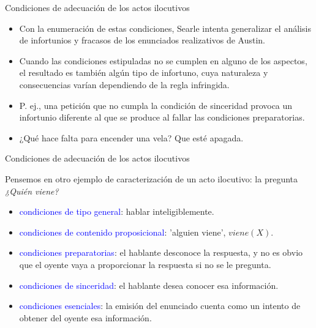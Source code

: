 \documentclass{beamer}
\begin{document}
\begin{frame}{Condiciones de adecuación de los actos ilocutivos}

	\begin{itemize}
		\item Con la enumeración de estas condiciones, Searle intenta generalizar el análisis de infortunios y fracasos de los enunciados realizativos de Austin. 
		\item Cuando las condiciones estipuladas no se cumplen en alguno de los aspectos, el resultado es también algún tipo de infortuno, cuya naturaleza y consecuencias varían dependiendo de la regla infringida.
		\item P. ej., una petición que no cumpla la condición de sinceridad provoca un infortunio diferente al que se produce al fallar las condiciones preparatorias.
		\item ¿Qué hace falta para encender una vela? \pause Que esté apagada.
	\end{itemize}

\end{frame}

\begin{frame}{Condiciones de adecuación de los actos ilocutivos}

	Pensemos en otro ejemplo de caracterización de un acto ilocutivo: la pregunta \it{¿Quién viene?}

	\begin{itemize}
		\item \textcolor{blue}{condiciones de tipo general}: hablar inteligiblemente.
		\item \textcolor{blue}{condiciones de contenido proposicional}: 'alguien viene', $viene(X)$.
		\item \textcolor{blue}{condiciones preparatorias}: el hablante desconoce la respuesta, y no es obvio que el oyente vaya a proporcionar la respuesta si no se le pregunta. 
		\item \textcolor{blue}{condiciones de sinceridad}: el hablante desea conocer esa información.
		\item \textcolor{blue}{condiciones esenciales}: la emisión del enunciado cuenta como un intento de obtener del oyente esa información. 
	\end{itemize}

\end{frame}
\end{document}
